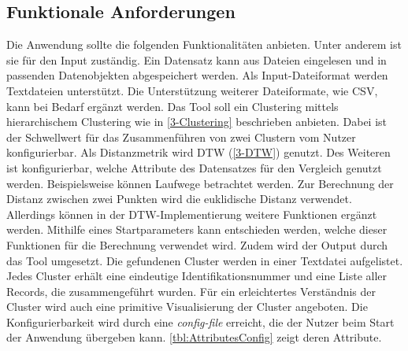 \subsection{Funktionale Anforderungen}
\label{4-FunktionaleAnforderungen}
Die Anwendung sollte die folgenden Funktionalitäten anbieten.
Unter anderem ist sie für den Input zuständig.
Ein Datensatz kann aus Dateien eingelesen und in passenden Datenobjekten abgespeichert werden.
Als Input-Dateiformat werden Textdateien unterstützt.
Die Unterstützung weiterer Dateiformate, wie CSV, kann bei Bedarf ergänzt werden.
Das Tool soll ein Clustering mittels hierarchischem Clustering wie in \autoref{3-Clustering} beschrieben anbieten.
Dabei ist der Schwellwert für das Zusammenführen von zwei Clustern vom Nutzer konfigurierbar.
Als Distanzmetrik wird \ac{DTW} (\autoref{3-DTW}) genutzt.
Des Weiteren ist konfigurierbar, welche Attribute des Datensatzes für den Vergleich genutzt werden.
Beispielsweise können Laufwege betrachtet werden.
Zur Berechnung der Distanz zwischen zwei Punkten wird die euklidische Distanz verwendet.
Allerdings können in der \ac{DTW}-Implementierung weitere Funktionen ergänzt werden.
Mithilfe eines Startparameters kann entschieden werden, welche dieser Funktionen für die Berechnung verwendet wird.
Zudem wird der Output durch das Tool umgesetzt.
Die gefundenen Cluster werden in einer Textdatei aufgelistet.
Jedes Cluster erhält eine eindeutige Identifikationsnummer und eine Liste aller Records, die zusammengeführt wurden.
Für ein erleichtertes Verständnis der Cluster wird auch eine primitive Visualisierung der Cluster angeboten.
Die Konfigurierbarkeit wird durch eine \emph{config-file} erreicht,
die der Nutzer beim Start der Anwendung übergeben kann.
\autoref{tbl:AttributesConfig} zeigt deren Attribute.
